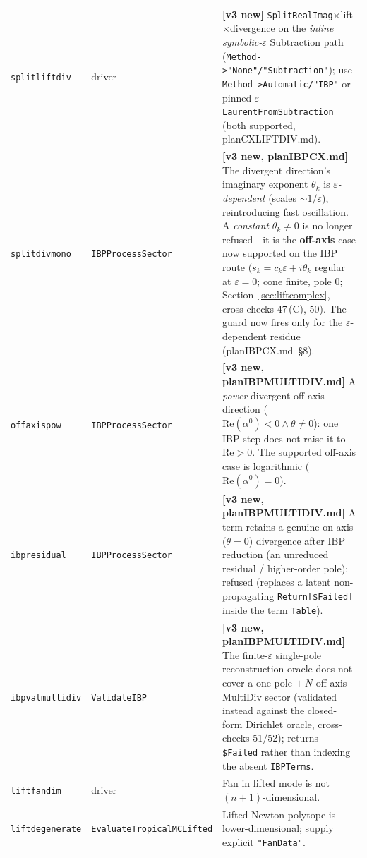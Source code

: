 \documentclass[11pt,a4paper]{article}
\begin{document}
\begin{center}
\begin{tabular}{llp{6.5cm}}
\texttt{splitliftdiv} & driver & \textbf{[v3 new]} \texttt{SplitRealImag}$\times$lift$\times$divergence on the \emph{inline symbolic-}$\varepsilon$ Subtraction path (\texttt{Method->"None"/"Subtraction"}); use \texttt{Method->Automatic/"IBP"} or pinned-$\varepsilon$ \texttt{LaurentFromSubtraction} (both supported, planCXLIFTDIV.md). \\
\texttt{splitdivmono} & \texttt{IBPProcessSector} & \textbf{[v3 new, planIBPCX.md]} The divergent direction's imaginary exponent $\theta_k$ is \emph{$\varepsilon$-dependent} (scales $\sim 1/\varepsilon$), reintroducing fast oscillation. A \emph{constant} $\theta_k\neq 0$ is no longer refused---it is the \textbf{off-axis} case now supported on the IBP route ($s_k=c_k\varepsilon+i\theta_k$ regular at $\varepsilon=0$; cone finite, pole $0$; Section~\ref{sec:liftcomplex}, cross-checks 47\,(C), 50). The guard now fires only for the $\varepsilon$-dependent residue (planIBPCX.md~\S8). \\
\texttt{offaxispow} & \texttt{IBPProcessSector} & \textbf{[v3 new, planIBPMULTIDIV.md]} A \emph{power}-divergent off-axis direction ($\mathrm{Re}(\alpha^0)<0\wedge\theta\neq0$): one IBP step does not raise it to $\mathrm{Re}>0$. The supported off-axis case is logarithmic ($\mathrm{Re}(\alpha^0)=0$). \\
\texttt{ibpresidual} & \texttt{IBPProcessSector} & \textbf{[v3 new, planIBPMULTIDIV.md]} A term retains a genuine on-axis ($\theta=0$) divergence after IBP reduction (an unreduced residual / higher-order pole); refused (replaces a latent non-propagating \texttt{Return[\$Failed]} inside the term \texttt{Table}). \\
\texttt{ibpvalmultidiv} & \texttt{ValidateIBP} & \textbf{[v3 new, planIBPMULTIDIV.md]} The finite-$\varepsilon$ single-pole reconstruction oracle does not cover a one-pole $+\,N$-off-axis MultiDiv sector (validated instead against the closed-form Dirichlet oracle, cross-checks 51/52); returns \texttt{\$Failed} rather than indexing the absent \texttt{IBPTerms}. \\
\texttt{liftfandim} & driver & Fan in lifted mode is not $(n{+}1)$-dimensional. \\
\texttt{liftdegenerate} & \texttt{EvaluateTropicalMCLifted} & Lifted Newton polytope is lower-dimensional; supply explicit \texttt{"FanData"}. \\
\bottomrule
\end{tabular}
\end{center}

\end{document}
